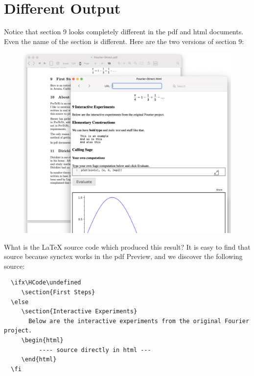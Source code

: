 \documentclass[11pt, oneside]{article}   	%
\begin{document}
\newpage
\section{Different Output} 

Notice that section 9 looks completely different in the pdf and html documents. Even the name of the section is different. Here are the two versions of section 9:

\quad
\begin{figure}[htbp] %
     \includegraphics[width=6.5in.]{Graphics/shot4.png} %
   \label{fig:example}
\end{figure}

What is the LaTeX source code which produced this result? It is easy to find that source because synctex works in the pdf Preview, and we discover the following source:

\begin{verbatim}
  \ifx\HCode\undefined
     \section{First Steps}
  \else
     \section{Interactive Experiments}
       Below are the interactive experiments from the original Fourier project. 
     \begin{html}
          ---- source directly in html ---
     \end{html}
  \fi
\end{verbatim}
\end{document}
